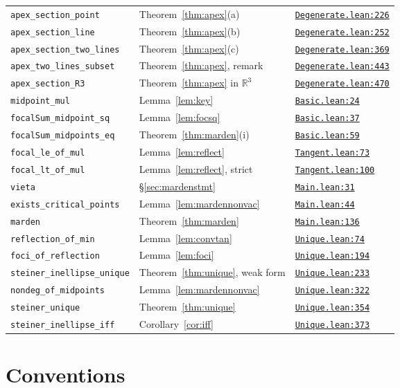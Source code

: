 \documentclass[11pt]{article}
\theoremstyle{remark}
\newcommand{\lean}[1]{\texttt{#1}}
\newcommand{\R}{\mathbb{R}}
\newcommand{\repoD}{https://github.com/jpbald93/dandelin}
\newcommand{\repoM}{https://github.com/jpbald93/marden}
\newcommand{\commitD}{205e4807a71d05898967d870e4528fb97d78b26d}
\newcommand{\commitM}{bd2cd3c9870905a04d38d079be4d83c824cbf9db}
\newcommand{\srcD}[2]{\href{\repoD/blob/\commitD/Dandelin/#1\#L#2}{\texttt{#1:#2}}}
\newcommand{\srcM}[2]{\href{\repoM/blob/\commitM/Marden/#1\#L#2}{\texttt{#1:#2}}}
\begin{document}
\begin{longtable}{@{}p{}p{}l@{}}
\lean{apex\_section\_point} & Theorem~\ref{thm:apex}(a) & \srcD{Degenerate.lean}{226} \\
\lean{apex\_section\_line} & Theorem~\ref{thm:apex}(b) & \srcD{Degenerate.lean}{252} \\
\lean{apex\_section\_two\_lines} & Theorem~\ref{thm:apex}(c) & \srcD{Degenerate.lean}{369} \\
\lean{apex\_two\_lines\_subset} & Theorem~\ref{thm:apex}, remark & \srcD{Degenerate.lean}{443} \\
\lean{apex\_section\_R3} & Theorem~\ref{thm:apex} in $\R^3$ & \srcD{Degenerate.lean}{470} \\
\midrule
\lean{midpoint\_mul} & Lemma~\ref{lem:key} & \srcM{Basic.lean}{24} \\
\lean{focalSum\_midpoint\_sq} & Lemma~\ref{lem:focsq} & \srcM{Basic.lean}{37} \\
\lean{focalSum\_midpoints\_eq} & Theorem~\ref{thm:marden}(i) & \srcM{Basic.lean}{59} \\
\lean{focal\_le\_of\_mul} & Lemma~\ref{lem:reflect} & \srcM{Tangent.lean}{73} \\
\lean{focal\_lt\_of\_mul} & Lemma~\ref{lem:reflect}, strict & \srcM{Tangent.lean}{100} \\
\lean{vieta} & \S\ref{sec:mardenstmt} & \srcM{Main.lean}{31} \\
\lean{exists\_critical\_points} & Lemma~\ref{lem:mardennonvac} & \srcM{Main.lean}{44} \\
\lean{marden} & Theorem~\ref{thm:marden} & \srcM{Main.lean}{136} \\
\lean{reflection\_of\_min} & Lemma~\ref{lem:convtan} & \srcM{Unique.lean}{74} \\
\lean{foci\_of\_reflection} & Lemma~\ref{lem:foci} & \srcM{Unique.lean}{194} \\
\lean{steiner\_inellipse\_unique} & Theorem~\ref{thm:unique}, weak form & \srcM{Unique.lean}{233} \\
\lean{nondeg\_of\_midpoints} & Lemma~\ref{lem:mardennonvac} & \srcM{Unique.lean}{322} \\
\lean{steiner\_unique} & Theorem~\ref{thm:unique} & \srcM{Unique.lean}{354} \\
\lean{steiner\_inellipse\_iff} & Corollary~\ref{cor:iff} & \srcM{Unique.lean}{373} \\
\end{longtable}

\section{Conventions}\label{sec:conv}
\end{document}
